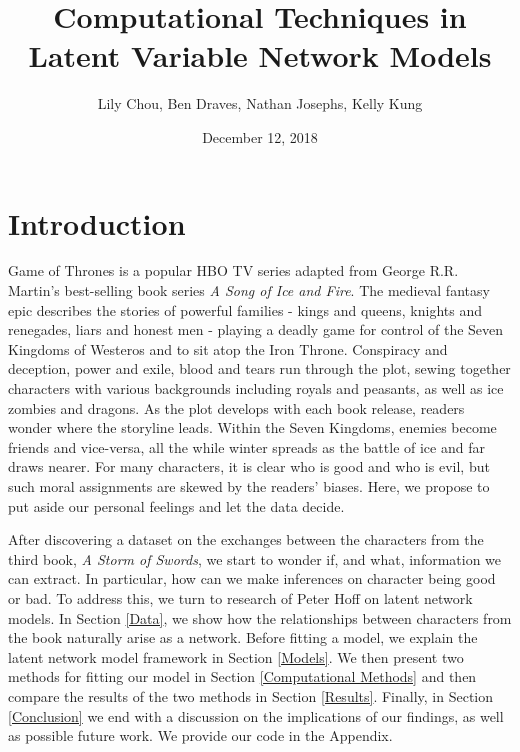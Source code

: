 \documentclass{article}
\title{Computational Techniques in Latent Variable Network Models}
\author{Lily Chou, Ben Draves, Nathan Josephs, Kelly Kung}
\date{December 12, 2018}
\begin{document}
\maketitle

\section{Introduction}

Game of Thrones is a popular HBO TV series adapted from George R.R. Martin's best-selling book series \textit{A Song of Ice and Fire}. The medieval fantasy epic describes the stories of powerful families - kings and queens, knights and renegades, liars and honest men - playing a deadly game for control of the Seven Kingdoms of Westeros and to sit atop the Iron Throne. Conspiracy and deception, power and exile, blood and tears run through the plot, sewing together characters with various backgrounds including royals and peasants, as well as ice zombies and dragons. As the plot develops with each book release, readers wonder where the storyline leads. Within the Seven Kingdoms, enemies become friends and vice-versa, all the while winter spreads as the battle of ice and far draws nearer. For many characters, it is clear who is good and who is evil, but such moral assignments are skewed by the readers' biases. Here, we propose to put aside our personal feelings and let the data decide.

After discovering a dataset on the exchanges between the characters from the third book, \textit{A Storm of Swords}, we start to wonder if, and what, information we can extract. In particular, how can we make inferences on character being good or bad. To address this, we turn to research of Peter Hoff on latent network models. In Section \ref{Data}, we show how the relationships between characters from the book naturally arise as a network. Before fitting a model, we explain the latent network model framework in Section \ref{Models}. We then present two methods for fitting our model in Section \ref{Computational Methods} and then compare the results of the two methods in Section \ref{Results}. Finally, in Section \ref{Conclusion} we end with a discussion on the implications of our findings, as well as possible future work. We provide our code in the Appendix.
\end{document}
